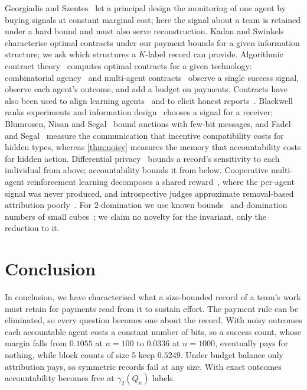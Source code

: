 \documentclass[sigconf,anonymous,acmthm=false]{acmart}
\theoremstyle{acmplain}
\theoremstyle{acmdefinition}
\begin{document}
Georgiadis and Szentes~\cite{georgiadisszentes2020} let a principal design the monitoring of
one agent by buying signals at constant marginal cost; here the signal about a team is
retained under a hard bound and must also serve reconstruction. Kadan and
Swinkels~\cite{kadanswinkels2008} characterise optimal contracts under our payment bounds for
a given information structure; we ask which structures a $K$-label record can provide.
Algorithmic contract theory~\cite{dutting2024survey} computes optimal contracts for a given
technology: combinatorial agency~\cite{babaioff2006combinatorial} and multi-agent
contracts~\cite{dutting2025multiagent,dutting2025combinatorial} observe a single success
signal, \cite{castiglioni2023multiagent} observe each agent's outcome, and
\cite{goel2024weighted} add a budget on payments. Contracts have also been used to align
learning agents~\cite{haupt2023contracts,ivanov2024principal} and to elicit honest
reports~\cite{shao2025truth}. Blackwell~\cite{blackwell1953comparisons} ranks experiments and
information design~\cite{kamenica2011persuasion} chooses a signal for a receiver; Blumrosen,
Nisan and Segal~\cite{blumrosen2007auctions} bound auctions with few-bit messages, and Fadel
and Segal~\cite{fadelsegal2009} measure the communication that incentive compatibility costs
for hidden types, whereas \cref{thm:noisy} measures the memory that accountability costs for
hidden action. Differential privacy~\cite{dwork2006calibrating} bounds a record's sensitivity
to each individual from above; accountability bounds it from below. Cooperative multi-agent
reinforcement learning decomposes a shared
reward~\cite{foerster2018coma,sunehag2018vdn,rashid2018qmix,li2025nucleolus}, where the
per-agent signal was never produced, and introspective judges approximate removal-based
attribution poorly~\cite{lu2026agents}. For 2-domination we use known
bounds~\cite{fink1985ndomination,chellali2012survey,bujtas2016bounds} and domination numbers
of small cubes~\cite{ostergard2001length9}; we claim no novelty for the invariant, only the
reduction to it.

\section{Conclusion}\label{sec:conclusion}

In conclusion, we have characterised what a size-bounded record of a team's work must retain
for payments read from it to sustain effort. The payment rule can be eliminated, so every
question becomes one about the record. With noisy outcomes each accountable agent costs a
constant number of bits, so a success count, whose margin falls from $0.1055$ at $n=100$ to
$0.0336$ at $n=1000$, eventually pays for nothing, while block counts of size 5 keep $0.5249$.
Under budget balance only attribution pays, so symmetric records fail at any size. With exact
outcomes accountability becomes free at $\gamma_2(Q_n)$ labels.
\end{document}
